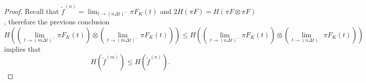 \documentclass[10pt,a4paper]{amsart}
\begin{document}
\begin{proof}
    Recall that $\widetilde{f}^{(n)} = \lim_{t\rightarrow (n\Delta t)^{-}}\pi F_{K}(t)$ and $2 H(\pi F) = H(\pi F \otimes \pi F)$, therefore the previous conclusion
    \begin{equation*}
        H\left(\left( \lim_{t\rightarrow (m\Delta t)^{-}}\pi F_{K}(t)\right) \otimes \left( \lim_{t\rightarrow (m\Delta t)^{-}}\pi F_{K}(t)\right)\right) \leq  H\left(\left( \lim_{t\rightarrow (n\Delta t)^{-}}\pi F_{K}(t)\right) \otimes \left( \lim_{t\rightarrow (n\Delta t)^{-}}\pi F_{K}(t)\right)\right)
    \end{equation*}
    implies that
    \begin{equation*}
        H(\widetilde{f}^{(m)}) \leq H(\widetilde{f}^{(n)}).
    \end{equation*}
    
    \end{proof}
\end{document}
